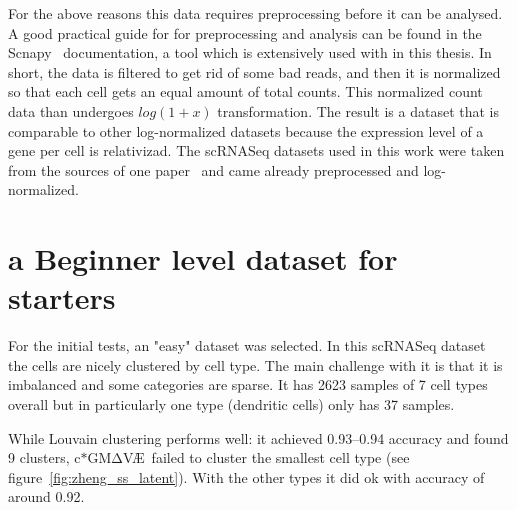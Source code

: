 \documentclass[11pt, a4paper]{report}
\theoremstyle{plain}
\theoremstyle{definition}
\theoremstyle{remark}
\newcommand{\gmvae}{c$\ast$GM$\mathrm{\Delta}$V\AE~}
\begin{document}
For the above reasons this data requires preprocessing before it can be
analysed. A good practical guide for for preprocessing and analysis 
can be found in the Scnapy~\cite{wolf2018scanpy} documentation, a tool which is 
extensively used with in this thesis.
In short, the data is filtered to get rid of some bad reads, and then it is
normalized so that each cell gets an equal amount of total counts. This
normalized  count data than undergoes $log(1+x)$ transformation.
The result is a dataset that is comparable to other
log-normalized datasets because the expression level of a gene per cell is 
relativizad.
The scRNASeq datasets used in this work were taken from the sources of one
paper~\cite{lotfollahi2019scgen} and came already preprocessed and
log-normalized.




\section{a Beginner level dataset for starters}

For the initial tests, an "easy" dataset was selected. In this scRNASeq
dataset~\cite{zheng2017massively} the cells are nicely clustered by cell type.
The main challenge with it is that it is imbalanced and some categories are
sparse. It has 2623 samples of 7 cell types overall but in particularly one type
(dendritic cells) only has 37 samples.

While Louvain clustering performs well: it achieved 0.93--0.94 accuracy and
found 9 clusters, \gmvae failed to cluster the smallest cell type (see
figure~\ref{fig:zheng_ss_latent}). With the other types it did ok with accuracy
of around 0.92.
\end{document}
